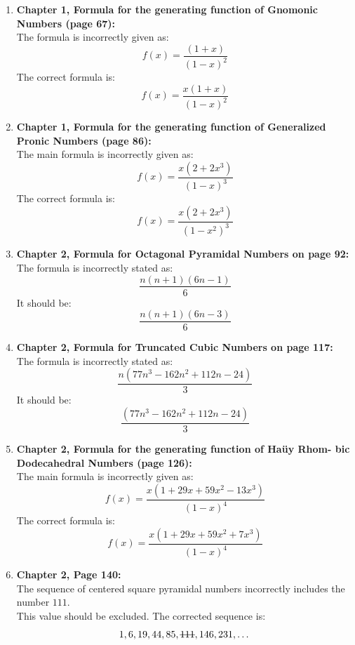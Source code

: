 \documentclass[10pt, a4paper]{article}
\begin{document}
\begin{enumerate}
    \item \textbf{Chapter 1, Formula for the generating function of Gnomonic Numbers (page 67):} \\
          The formula is incorrectly given as:
          \[
              f(x) = \frac{ (1 + x)}{ (1 - x)^2}
          \]
          The correct formula is:
          \[
              f(x) = \frac{x  (1 + x)}{ (1 - x)^2}
          \]

    \item \textbf{Chapter 1, Formula for the generating function of Generalized Pronic Numbers (page 86):} \\
          The main formula is incorrectly given as:
          \[
              f(x) = \frac{ x(2 + 2x^3)}{ (1 - x)^3}
          \]
          The correct formula is:
          \[
              f(x) = \frac{ x(2 + 2x^3)}{ (1 - x^2)^3}
          \]


    \item \textbf{Chapter 2, Formula for Octagonal Pyramidal Numbers on page 92:} \\
          The formula is incorrectly stated as:
          \[
              \frac{n(n+1)(6n-1)}{6}
          \]
          It should be:
          \[
              \frac{n(n+1)(6n-3)}{6}
          \]

    \item \textbf{Chapter 2, Formula for Truncated Cubic Numbers on page 117:} \\
          The formula is incorrectly stated as:
          \[
              \frac{n(77n^3 -162n^2+112n - 24)}{3}
          \]
          It should be:
          \[
              \frac{(77n^3 -162n^2+112n - 24)}{3}
          \]

    \item \textbf{Chapter 2, Formula for the generating function of Haüy Rhom-
              bic Dodecahedral Numbers (page 126):} \\
          The main formula is incorrectly given as:
          \[
              f(x) = \frac{ x(1 + 29x + 59x^2 - 13x^3)}{ (1 - x)^4}
          \]
          The correct formula is:
          \[
              f(x) = \frac{ x(1 + 29x + 59x^2 + 7x^3)}{ (1 - x)^4}
          \]

    \item \textbf{Chapter 2, Page 140:} \\
          The sequence of centered square pyramidal numbers incorrectly includes the number \(111\). \\
          This value should be excluded. The corrected sequence is:
          \[
              1, 6, 19, 44, 85, \text{\sout{111}}, 146, 231, \dots
          \]


\end{enumerate}
\end{document}
